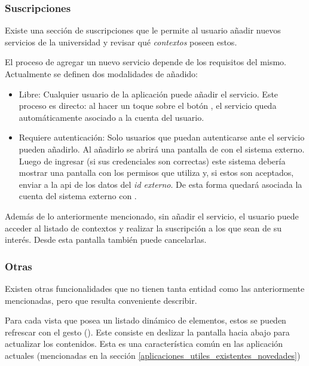 \subsubsection{Suscripciones}
\label{funcionalidad_suscripciones}

Existe una sección de suscripciones que le permite al usuario añadir nuevos servicios de la universidad y revisar qué \textit{contextos} poseen estos.

El proceso de agregar un nuevo servicio depende de los requisitos del mismo. Actualmente se definen dos modalidades de añadido:
\begin{itemize}
\item Libre: Cualquier usuario de la aplicación puede añadir el servicio. Este proceso es directo: al hacer un toque sobre el botón , el servicio queda automáticamente asociado a la cuenta del usuario.
\item Requiere autenticación: Solo usuarios que puedan autenticarse ante el servicio pueden añadirlo. Al añadirlo se abrirá una pantalla de  con el sistema externo. Luego de ingresar (si sus credenciales son correctas) este sistema debería mostrar una pantalla con los permisos que utiliza y, si estos son aceptados, enviar a la \gls{api} de \nombreApp{} los datos del \textit{id externo}. De esta forma quedará asociada la cuenta del sistema externo con \nombreApp{}. 
\end{itemize}

Además de lo anteriormente mencionado, sin añadir el servicio, el usuario puede acceder al listado de contextos y realizar la suscripción a los que sean de su interés. Desde esta pantalla también puede cancelarlas.

\subsubsection{Otras}
\label{funcionalidad_otras}

Existen otras funcionalidades que no tienen tanta entidad como las anteriormente mencionadas, pero que resulta conveniente describir.

Para cada vista que posea un listado dinámico de elementos, estos se pueden refrescar con el gesto  (). Este consiste en deslizar la pantalla hacia abajo para actualizar los contenidos. Esta es una característica común en las aplicación actuales (mencionadas en la sección \ref{aplicaciones_utiles_existentes_novedades})
